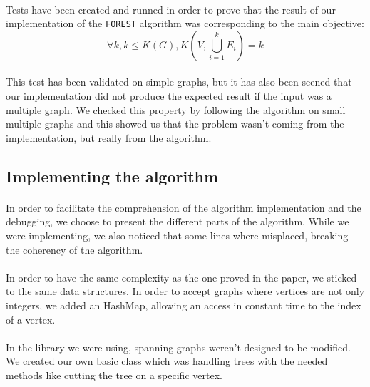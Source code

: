 
\paragraph{}
Tests have been created and runned in order to prove that the result of our
implementation of the \verb!FOREST! algorithm was corresponding to the main
objective:
$$\forall k, k \leq K(G),K(V,\bigcup \limits_{i=1}^k E_i) = k$$

\paragraph{}
This test has been validated on simple graphs, but it has also been seened that
our implementation did not produce the expected result if the input was a
multiple graph. We checked this property by following the algorithm on small
multiple graphs and this showed us that the problem wasn't coming from the
implementation, but really from the algorithm.

\subsection{Implementing the algorithm}
\paragraph{}
In order to facilitate the comprehension of the algorithm implementation and
the debugging, we choose to present the different parts of the algorithm. While
we were implementing, we also noticed that some lines where misplaced, breaking
the coherency of the algorithm.

\paragraph{}
In order to have the same complexity as the one proved in the paper, we sticked
to the same data structures. In order to accept graphs where vertices are not
only integers, we added an HashMap, allowing an access in constant time to the
index of a vertex.

\paragraph{}
In the library we were using, spanning graphs weren't designed to be modified. We
created our own basic class which was handling trees with the needed methods
like cutting the tree on a specific vertex.

